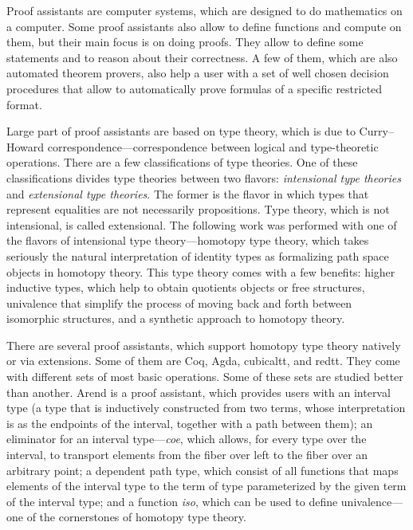 \Introduction

Proof assistants are computer systems, which are designed to do mathematics on a computer. Some proof assistants also allow to define functions and compute on them, but their main focus is on doing proofs. They allow to define some statements and to reason about their correctness. A few of them, which are also automated theorem provers, also help a user with a set of well chosen decision procedures that allow to automatically prove formulas of a specific restricted format\autocite{ProofAssistants1}.

Large part of proof assistants are based on type theory, which is due to Curry–Howard correspondence---correspondence between logical and type-theoretic operations. There are a few classifications of type theories. One of these classifications divides type theories between two flavors: \textit{intensional type theories} and \textit{extensional type theories}. The former is the flavor in which types that represent equalities are not necessarily propositions. Type theory, which is not intensional, is called extensional. The following work was performed with one of the flavors of intensional type theory---homotopy type theory, which takes seriously the natural interpretation of identity types as formalizing path space objects in homotopy theory. This type theory comes with a few benefits: higher inductive types, which help to obtain quotients objects or free structures, univalence that simplify the process of moving back and forth between isomorphic structures, and a synthetic approach to homotopy theory.

There are several proof assistants, which support homotopy type theory natively or via extensions. Some of them are Coq\autocite{coq}, Agda\autocite{agda}, cubicaltt\autocite{cubicaltt}, and redtt\autocite{redtt}. They come with different sets of most basic operations. Some of these sets are studied better than another. Arend\autocite{arend} is a proof assistant, which provides users with an interval type (a type that is inductively constructed from two terms, whose interpretation is as the endpoints of the interval, together with a path between them); an eliminator for an interval type---\textit{coe}, which allows, for every type over the interval, to transport elements from the fiber over left to the fiber over an arbitrary point; a dependent path type, which consist of all functions that maps elements of the interval type to the term of type parameterized by the given term of the interval type; and a function \textit{iso}, which can be used to define univalence---one of the cornerstones of homotopy type theory\autocite{arenddocs}\autocite{ncatlabIntervalType}.

